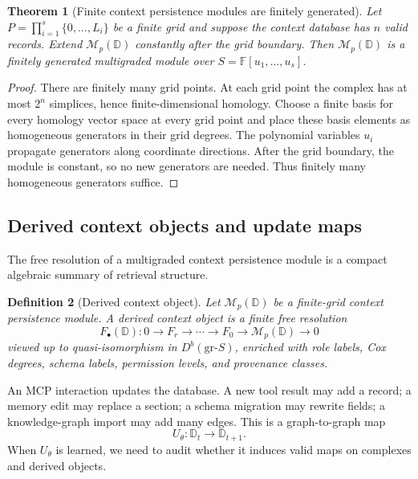 \documentclass[11pt]{article}
\newtheorem{theorem}{Theorem}[section]
\newtheorem{definition}[theorem]{Definition}
\newcommand{\FF}{\mathbb{F}}
\newcommand{\calM}{\mathcal{M}}
\numberwithin{equation}{section}
\begin{document}
\begin{theorem}[Finite context persistence modules are finitely generated]
Let $P=\prod_{i=1}^s\{0,\ldots,L_i\}$ be a finite grid and suppose the context database has $n$ valid records. Extend $\calM_p(\mathbb{D})$ constantly after the grid boundary. Then $\calM_p(\mathbb{D})$ is a finitely generated multigraded module over $S=\FF[u_1,
\ldots,u_s]$.
\end{theorem}
\begin{proof}
There are finitely many grid points. At each grid point the complex has at most $2^n$ simplices, hence finite-dimensional homology. Choose a finite basis for every homology vector space at every grid point and place these basis elements as homogeneous generators in their grid degrees. The polynomial variables $u_i$ propagate generators along coordinate directions. After the grid boundary, the module is constant, so no new generators are needed. Thus finitely many homogeneous generators suffice.
\end{proof}

\subsection{Derived context objects and update maps}
The free resolution of a multigraded context persistence module is a compact algebraic summary of retrieval structure.
\begin{definition}[Derived context object]
Let $\calM_p(\mathbb{D})$ be a finite-grid context persistence module. A derived context object is a finite free resolution
\begin{equation}
F_\bullet(\mathbb{D}):0\to F_r\to\cdots\to F_0\to\calM_p(\mathbb{D})\to 0
\end{equation}
viewed up to quasi-isomorphism in $D^b(\mathrm{gr}\text{-}S)$, enriched with role labels, Cox degrees, schema labels, permission levels, and provenance classes.
\end{definition}

An MCP interaction updates the database. A new tool result may add a record; a memory edit may replace a section; a schema migration may rewrite fields; a knowledge-graph import may add many edges. This is a graph-to-graph map
\begin{equation}
U_\theta:\mathbb{D}_t\longrightarrow \mathbb{D}_{t+1}.
\end{equation}
When $U_\theta$ is learned, we need to audit whether it induces valid maps on complexes and derived objects.
\end{document}

